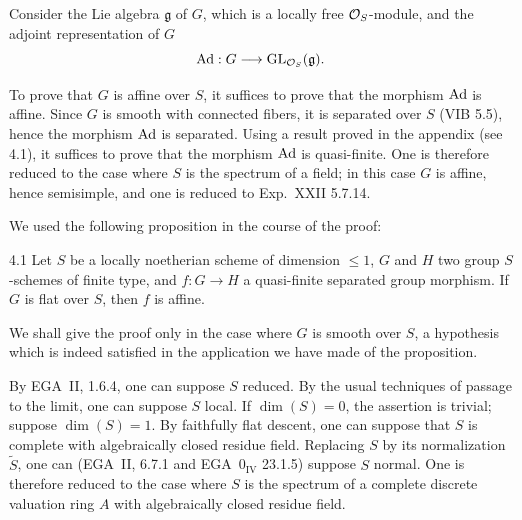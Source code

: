 Consider the Lie algebra $\mathfrak g$ of $G$, which is a locally free $\mathcal{O}_S$-module, and the adjoint representation of $G$
\[
\operatorname{Ad}:G\longrightarrow\operatorname{GL}_{\mathcal{O}_S}(\mathfrak g).
\]

To prove that $G$ is affine over $S$, it suffices to prove that the morphism $\operatorname{Ad}$ is affine. Since $G$ is smooth with connected fibers, it is separated over $S$ (VIB 5.5), hence the morphism $\operatorname{Ad}$ is separated. Using a result proved in the appendix (see 4.1), it suffices to prove that the morphism $\operatorname{Ad}$ is quasi-finite. One is therefore reduced to the case where $S$ is the spectrum of a field; in this case $G$ is affine, hence semisimple, and one is reduced to Exp.~XXII 5.7.14.

We used the following proposition in the course of the proof:
\begin{proposition}{4.1}\label{XXV.4.1}
Let $S$ be a locally noetherian scheme of dimension $\le1$, $G$ and $H$ two group $S$-schemes of finite type, and $f:G\to H$ a quasi-finite separated group morphism. If $G$ is flat over $S$, then $f$ is affine.
\end{proposition}
We shall give the proof only in the case where $G$ is smooth over $S$, a hypothesis which is indeed satisfied in the application we have made of the proposition.

\label{XXV.4.2}
By EGA~II, 1.6.4, one can suppose $S$ reduced. By the usual techniques of passage to the limit, one can suppose $S$ local. If $\dim(S)=0$, the assertion is trivial; suppose $\dim(S)=1$. By faithfully flat descent, one can suppose that $S$ is complete with algebraically closed residue field. Replacing $S$ by its normalization $\widetilde S$, one can (EGA~II, 6.7.1 and EGA~0$_{\mathrm{IV}}$ 23.1.5) suppose $S$ normal. One is therefore reduced to the case where $S$ is the spectrum of a complete discrete valuation ring $A$ with algebraically closed residue field.

